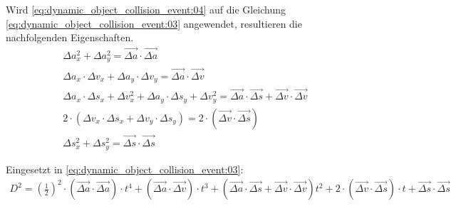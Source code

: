 Wird \ref{eq:dynamic_object_collision_event:04} auf die Gleichung \ref{eq:dynamic_object_collision_event:03} angewendet, resultieren die nachfolgenden
Eigenschaften.
\begin{align}
    \Delta a_x^2 + \Delta a_y^2 = \vec{\Delta a} \cdot \vec{\Delta a} \\
    \Delta a_x \cdot \Delta v_x + \Delta a_y \cdot \Delta v_y = \vec{\Delta a} \cdot \vec{\Delta v} \\
    \Delta a_x \cdot \Delta s_x + \Delta v_x^2 + \Delta a_y \cdot \Delta s_y + \Delta v_y^2 = \vec{\Delta a} \cdot \vec{\Delta s} + \vec{\Delta v} \cdot \vec{\Delta v} \\
    2 \cdot (\Delta v_x \cdot \Delta s_x + \Delta v_y \cdot \Delta s_y) = 2 \cdot (\vec{\Delta v} \cdot \vec{\Delta s}) \\
    \Delta s_x^2 + \Delta s_y^2 = \vec{\Delta s} \cdot \vec{\Delta s}
\end{align}

Eingesetzt in \ref{eq:dynamic_object_collision_event:03}:
\begin{align}
    D^2 = (\frac{1}{2})^2 \cdot (\vec{\Delta a} \cdot \vec{\Delta a}) \cdot t^4 +
        (\vec{\Delta a} \cdot \vec{\Delta v}) \cdot t^3 +
        (\vec{\Delta a} \cdot \vec{\Delta s} + \vec{\Delta v} \cdot \vec{\Delta v}) t^2 +
        2 \cdot (\vec{\Delta v} \cdot \vec{\Delta s}) \cdot t +
        \vec{\Delta s} \cdot \vec{\Delta s}
\end{align}